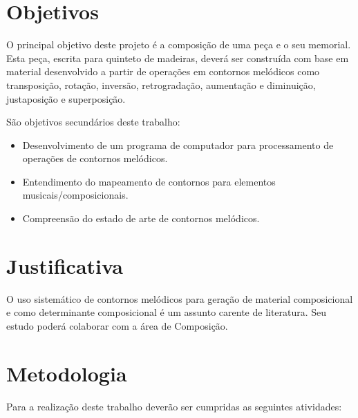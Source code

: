 \documentclass{article}
\begin{document}
\section{Objetivos}
\label{sec:objetivos}

O principal objetivo deste projeto é  a composição de uma peça e o seu
memorial.  Esta peça, escrita  para quinteto  de madeiras,  deverá ser
construída com base em material  desenvolvido a partir de operações em
contornos    melódicos   como    transposição,    rotação,   inversão,
retrogradação, aumentação e diminuição, justaposição e superposição.

São objetivos secundários deste trabalho:

\begin{itemize}
\item Desenvolvimento de um programa de computador para processamento
  de operações de contornos melódicos.
\item Entendimento do mapeamento de contornos para elementos
  musicais/composicionais.
\item Compreensão do estado de arte de contornos melódicos.
\end{itemize}

\section{Justificativa}
\label{sec:justificativa}

O uso sistemático de contornos melódicos para geração de material
composicional e como determinante composicional é um assunto carente
de literatura. Seu estudo poderá colaborar com a área de Composição.

\section{Metodologia}
\label{sec:metodologia}

Para a realização deste trabalho deverão ser cumpridas as seguintes
atividades:
\end{document}
